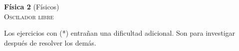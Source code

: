 \documentclass[11pt,spanish,a4paper]{article}
\begin{document}
\begin{center}
\textbf{Física 2} (Físicos) \hfill {}\\
	\textsc{\LARGE Oscilador libre}\\
\end{center}

Los ejercicios con (*) entrañan una dificultad adicional. Son para investigar después de resolver los demás.


\begin{enumerate}



\end{enumerate}
\end{document}
